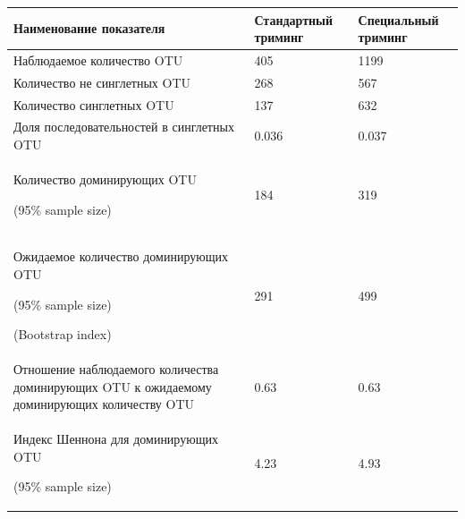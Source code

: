 \documentclass[a4paper,12pt,openany,final]{extreport}
\begin{document}
\begin{longtable}[]{@{}lll@{}}
\toprule
\textbf{Наименование показателя} & \textbf{Стандартный триминг} &
\textbf{Специальный триминг}\tabularnewline
\midrule
\endhead
Наблюдаемое количество OTU & 405 & 1199\tabularnewline
Количество не синглетных OTU & 268 & 567\tabularnewline
Количество синглетных OTU & 137 & 632\tabularnewline
Доля последовательностей в синглетных OTU & 0.036 & 0.037\tabularnewline
\begin{minipage}[t]{0.32\columnwidth}\raggedright
Количество доминирующих OTU

(95\% sample size)\strut
\end{minipage} & \begin{minipage}[t]{0.32\columnwidth}\raggedright
184\strut
\end{minipage} & \begin{minipage}[t]{0.32\columnwidth}\raggedright
319\strut
\end{minipage}\tabularnewline
\begin{minipage}[t]{0.32\columnwidth}\raggedright
Ожидаемое количество доминирующих OTU

(95\% sample size)

(Bootstrap index)\strut
\end{minipage} & \begin{minipage}[t]{0.32\columnwidth}\raggedright
291\strut
\end{minipage} & \begin{minipage}[t]{0.32\columnwidth}\raggedright
499\strut
\end{minipage}\tabularnewline
Отношение наблюдаемого количества доминирующих OTU к ожидаемому
доминирующих количеству OTU & 0.63 & 0.63\tabularnewline
\begin{minipage}[t]{0.32\columnwidth}\raggedright
Индекс Шеннона для доминирующих OTU

(95\% sample size)\strut
\end{minipage} & \begin{minipage}[t]{0.32\columnwidth}\raggedright
4.23\strut
\end{minipage} & \begin{minipage}[t]{0.32\columnwidth}\raggedright
4.93\strut
\end{minipage}\tabularnewline
\bottomrule
\end{longtable}
\end{document}
